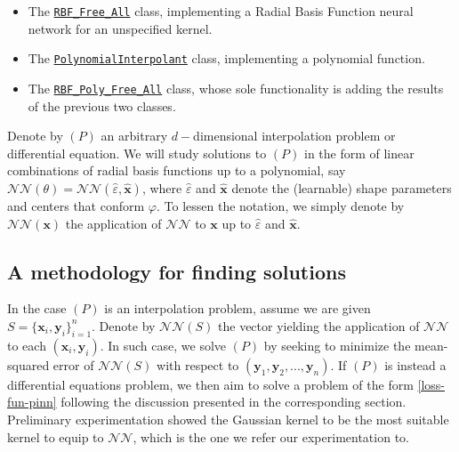 \documentclass[12pt]{report} %
\newcommand{\tmmathbf}[1]{\ensuremath{\boldsymbol{#1}}}
\begin{document}
\begin{itemize}
  \item The \href{https://github.com/heqro/tfm-experiments/blob/4fd010c560a247b00def20dd94d1f984d7992a24/modules/nn_rbf.py\#L6}{\texttt{RBF\_Free\_All}} class, implementing a Radial Basis Function neural network for an unspecified kernel.
  \item The \href{https://github.com/heqro/tfm-experiments/blob/4fd010c560a247b00def20dd94d1f984d7992a24/modules/nn_poly.py#L6}{\texttt{PolynomialInterpolant}} class, implementing a polynomial function.
  \item The \href{https://github.com/heqro/tfm-experiments/blob/4fd010c560a247b00def20dd94d1f984d7992a24/modules/nn_rbf_poly.py#L8}{\texttt{RBF\_Poly\_Free\_All}} class, whose sole functionality is adding the results of the previous two classes.
\end{itemize}

Denote by $(P)$  an arbitrary $d-$dimensional interpolation problem or differential equation. We will study solutions to $(P)$ in the form of linear combinations of radial basis functions up to a polynomial, say $\mathcal{NN}(\theta) = \mathcal{NN}(\hat{\varepsilon}, \hat{\tmmathbf{x}})$, where $\hat{\varepsilon}$ and $\hat{\tmmathbf{x}}$ denote the (learnable) shape parameters and centers that conform $\varphi$. To lessen the notation, we simply denote by $\mathcal{NN}(\tmmathbf{x})$ the application of $\mathcal{NN}$ to $\tmmathbf{x}$ up to $\hat{\varepsilon}$ and $\hat{\tmmathbf{x}}$.

\subsection{A methodology for finding solutions}

In the case $(P)$ is an interpolation problem, assume we are given $S = \{\tmmathbf{x}_i, \tmmathbf{y}_i\}_{i=1}^n$. Denote by $\mathcal{NN}(S)$ the vector yielding the application of $\mathcal{NN}$ to each $(\tmmathbf{x}_i, \tmmathbf{y}_i)$. In such case, we solve $(P)$ by seeking to minimize the mean-squared error of $\mathcal{NN}(S)$ with respect to $(\tmmathbf{y}_1, \tmmathbf{y}_2, ..., \tmmathbf{y}_n)$. If $(P)$ is instead a differential equations problem, we then aim to solve a problem of the form \eqref{loss-fun-pinn} following the discussion presented in the corresponding section. Preliminary experimentation showed the Gaussian kernel to be the most suitable kernel to equip to $\mathcal{NN}$, which is the one we refer our experimentation to.
\end{document}
